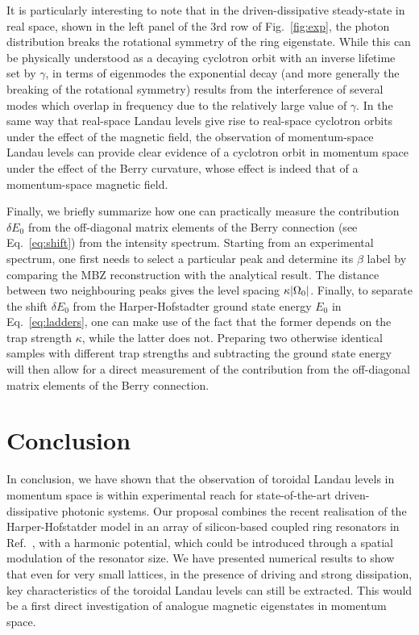 It is particularly interesting to note that in the driven-dissipative
steady-state in real space, shown in the left panel of the 3rd row of
Fig.~\ref{fig:exp}, the photon distribution breaks the rotational
symmetry of the ring eigenstate. While this can be physically
understood as a decaying cyclotron orbit with an inverse lifetime set
by $\gamma$, in terms of eigenmodes the exponential decay (and more
generally the breaking of the rotational symmetry) results from the
interference of several modes which overlap in frequency due to the
relatively large value of $\gamma$.  In the same way that real-space
Landau levels give rise to real-space cyclotron orbits under the
effect of the magnetic field, the observation of momentum-space Landau
levels can provide clear evidence of a cyclotron orbit in momentum
space under the effect of the Berry curvature, whose effect is indeed
that of a momentum-space magnetic field.

Finally, we briefly summarize how one can practically measure the
contribution $\delta E_0$ from the off-diagonal matrix elements of the
Berry connection (see Eq.~\eqref{eq:shift}) from the intensity
spectrum. Starting from an experimental spectrum, one first needs to
select a particular peak and determine its $\beta$ label by comparing
the MBZ reconstruction with the analytical result. The distance
between two neighbouring peaks gives the level spacing $\kappa
\vert \Omega_0 \vert$. Finally, to separate the shift $\delta E_0$ from the
Harper-Hofstadter ground state energy $E_0$ in Eq.~\eqref{eq:ladders},
one can make use of the fact that the former depends on the trap
strength $\kappa$, while the latter does not. Preparing two otherwise
identical samples with different trap strengths and subtracting the
ground state energy will then allow for a direct measurement of the
contribution from the off-diagonal matrix elements of the Berry
connection.

\section{Conclusion}
\label{sec:conclusion}

In conclusion, we have shown that the observation of toroidal Landau
levels in momentum space is within experimental reach for
state-of-the-art driven-dissipative photonic systems. Our proposal
combines the recent realisation of the Harper-Hofstatder model in an
array of silicon-based coupled ring resonators in
Ref.~\cite{hafezi2013imaging}, with a harmonic potential, which could
be introduced through a spatial modulation of the resonator size. We
have presented numerical results to show that even for very small
lattices, in the presence of driving and strong dissipation, key
characteristics of the toroidal Landau levels can still be
extracted. This would be a first direct investigation of analogue
magnetic eigenstates in momentum space.

